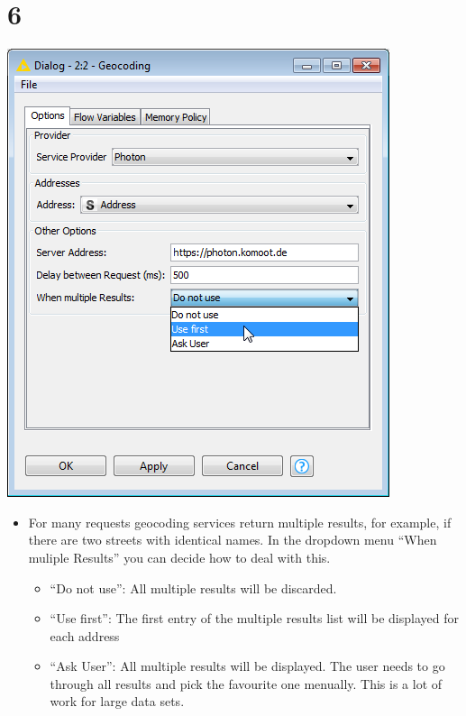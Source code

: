 \documentclass[10pt]{beamer}
\begin{document}
\section{6}
\begin{frame}
	\begin{center}
  		\includegraphics[height=0.5\textheight]{6.png}
	\end{center}
	\begin{itemize}
		\item For many requests geocoding services return multiple results, for example, if there are two streets with identical names. In the dropdown menu ``When muliple Results'' you can decide how to deal with this.
    \begin{itemize}
        \item[\textbullet] ``Do not use'': All multiple results will be discarded.
        \item[\textbullet] ``Use first'': The first entry of the multiple results list will be displayed for each address
		    \item[\textbullet] ``Ask User'': All multiple results will be displayed. The user needs to go through  all results and pick the favourite one menually. This is a lot of work for large data sets.
        \end{itemize}
  \end{itemize}
\end{frame}
\end{document}
